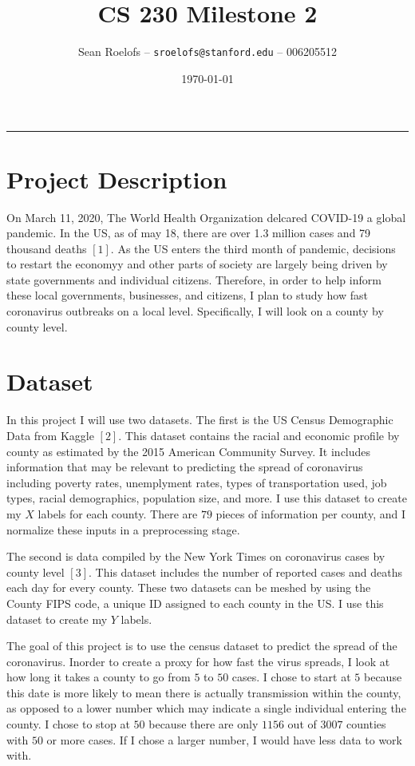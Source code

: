 \documentclass[12pt]{article}
\title{CS 230 Milestone 2}
\author{Sean Roelofs -- \texttt{sroelofs@stanford.edu} -- 006205512}
\date{\today}
\begin{document}
\maketitle

\vspace{-0.3in}

\rule{\linewidth}{0.4pt}

\section{Project Description}
    On March 11, 2020, The World Health Organization delcared COVID-19 a global pandemic. In the US, as of may 18, there are over 1.3 million cases and 79 thousand deaths $[1]$. As the US enters the third month of pandemic, decisions to restart the economyy and other parts of society are largely being driven by state governments and individual citizens. Therefore, in order to help inform these local governments, businesses, and citizens, I plan to study how fast coronavirus outbreaks on a local level. Specifically, I will look on a county by county level.


\section{Dataset}

    In this project I will use two datasets. The first is the US Census Demographic Data from Kaggle $[2]$. This dataset contains the racial and economic profile by county as estimated by the 2015 American Community Survey. It includes information that may be relevant to predicting the spread of coronavirus including poverty rates, unemplyment rates, types of transportation used, job types, racial demographics, population size, and more. I use this dataset to create my $X$ labels for each county. There are $79$ pieces of information per county, and I normalize these inputs in a preprocessing stage.

    The second is data compiled by the New York Times on coronavirus cases by county level $[3]$. This dataset includes the number of reported cases and deaths each day for every county. These two datasets can be meshed by using the County FIPS code, a unique ID assigned to each county in the US. I use this dataset to create my $Y$ labels.

    The goal of this project is to use the census dataset to predict the spread of the coronavirus. Inorder to create a proxy for how fast the virus spreads, I look at how long it takes a county to go from $5$ to $50$ cases. I chose to start at $5$ because this date is more likely to mean there is actually transmission within the county, as opposed to a lower number which may indicate a single individual entering the county. I chose to stop at $50$ because there are only $1156$ out of $3007$ counties with $50$ or more cases. If I chose a larger number, I would have less data to work with.
\end{document}
